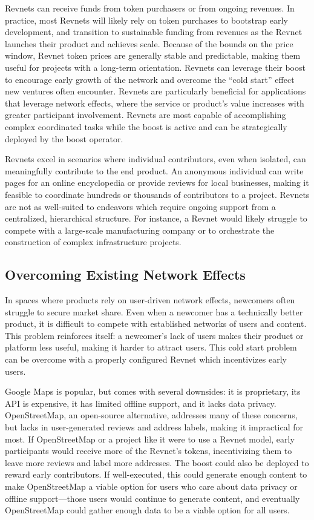 \documentclass{article}
\begin{document}
Revnets can receive funds from token purchasers or from ongoing revenues. In practice, most Revnets will likely rely on token purchases to bootstrap early development, and transition to sustainable funding from revenues as the Revnet launches their product and achieves scale. Because of the bounds on the price window, Revnet token prices are generally stable and predictable, making them useful for projects with a long-term orientation. Revnets can leverage their boost to encourage early growth of the network and overcome the ``cold start'' effect new ventures often encounter. Revnets are particularly beneficial for applications that leverage network effects, where the service or product's value increases with greater participant involvement. Revnets are most capable of accomplishing complex coordinated tasks while the boost is active and can be strategically deployed by the boost operator.

Revnets excel in scenarios where individual contributors, even when isolated, can meaningfully contribute to the end product. An anonymous individual can write pages for an online encyclopedia or provide reviews for local businesses, making it feasible to coordinate hundreds or thousands of contributors to a project. Revnets are not as well-suited to endeavors which require ongoing support from a centralized, hierarchical structure. For instance, a Revnet would likely struggle to compete with a large-scale manufacturing company or to orchestrate the construction of complex infrastructure projects.

\subsection{Overcoming Existing Network Effects}

In spaces where products rely on user-driven network effects, newcomers often struggle to secure market share. Even when a newcomer has a technically better product, it is difficult to compete with established networks of users and content. This problem reinforces itself: a newcomer's lack of users makes their product or platform less useful, making it harder to attract users. This cold start problem can be overcome with a properly configured Revnet which incentivizes early users.

Google Maps is popular, but comes with several downsides: it is proprietary, its API is expensive, it has limited offline support, and it lacks data privacy. OpenStreetMap, an open-source alternative, addresses many of these concerns, but lacks in user-generated reviews and address labels, making it impractical for most. If OpenStreetMap or a project like it were to use a Revnet model, early participants would receive more of the Revnet's tokens, incentivizing them to leave more reviews and label more addresses. The boost could also be deployed to reward early contributors. If well-executed, this could generate enough content to make OpenStreetMap a viable option for users who care about data privacy or offline support---those users would continue to generate content, and eventually OpenStreetMap could gather enough data to be a viable option for all users.
\end{document}
